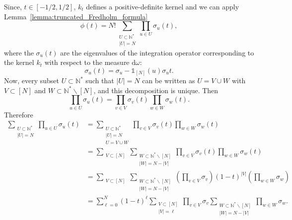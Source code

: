 \documentclass[twoside,11pt]{book}
\numberwithin{theorem}{chapter}
\numberwithin{definition}{chapter}
\numberwithin{proposition}{chapter}
\numberwithin{corollary}{chapter}
\numberwithin{example}{chapter}
\numberwithin{lemma}{chapter}
\numberwithin{assumption}{chapter}
\begin{document}
Since, $t \in [-1/2,1/2]$, $k_{t}$ defines a positive-definite kernel and we can apply Lemma~\ref{lemma:truncated_Fredholm_formula}
\begin{equation}
\phi(t) = N!\sum\limits_{\substack{U \subset \mathbb{N}^{*}\\ |U| = N}} \prod\limits_{u \in U} \sigma_{u}(t),
\end{equation}
where the $\sigma_{u}(t)$ are the eigenvalues of the integration operator corresponding to the kernel $k_{t}$ with respect to the measure $\mathrm{d}\omega$:
\begin{equation}
\sigma_{u}(t) = \sigma_{u} - \mathbb{1}_{[N]}(u)\sigma_{u} t.
\end{equation}
Now, every subset $U \subset \mathbb{N}^{*}$ such that $|U| = N$ can be written as $U = V \cup W$ with $V \subset [N]$ and $W \subset \mathbb{N}^{*} \smallsetminus [N]$, and this decomposition is unique. Then
\begin{equation}
\prod\limits_{u \in U}\sigma_{u}(t) = \prod\limits_{v \in V}\sigma_{v}(t) \prod\limits_{w \in W}\sigma_{w}(t).
\end{equation}
Therefore
\begin{align}
    \sum\limits_{\substack{U \subset \mathbb{N}^{*} \\ |U| = N}} \prod\limits_{u \in U}\sigma_{u}(t) & = \sum\limits_{\substack{U \subset \mathbb{N}^{*} \\ |U| = N\\ U = V \cup W}} \prod\limits_{v \in V}\sigma_{v}(t) \prod\limits_{w \in W}\sigma_{w}(t) \\
    & = \sum\limits_{\substack{V \subset [N]}} \sum\limits_{\substack{W \subset \mathbb{N}^{*}\smallsetminus [N]\\ |W| = N-|V|}} \prod\limits_{v \in V}\sigma_{v}(t) \prod\limits_{w \in W}\sigma_{w}(t) \nonumber\\
    & = \sum\limits_{\substack{V \subset [N]}} \sum\limits_{\substack{W \subset \mathbb{N}^{*}\smallsetminus [N]\\ |W| = N-|V|}} (\prod\limits_{v \in V}\sigma_{v})(1-t)^{|V|} (\prod\limits_{w \in W}\sigma_{w}) \nonumber\\
    & =\sum\limits_{\ell =0}^{N} (1-t)^{\ell} \sum\limits_{\substack{V \subset [N]\\|V| = \ell}} \prod\limits_{v \in V}\sigma_{v}  \sum\limits_{\substack{W \subset \mathbb{N}^{*} \smallsetminus[N]\\  |W|= N-|V|}}  \prod\limits_{w \in W}\sigma_{w}.
\end{align}
\end{document}
